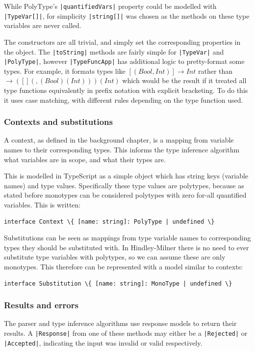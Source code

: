 \documentclass[a4paper,fleqn,oneside,12pt]{report}
\begin{document}
While PolyType’s \texttt{|quantifiedVars|} property could be modelled with \texttt{|TypeVar[]|}, for simplicity \texttt{|string[]|} was chosen as the methods on these type variables are never called.

The constructors are all trivial, and simply set the corresponding properties in the object. The \texttt{|toString|} methods are fairly simple for \texttt{|TypeVar|} and \texttt{|PolyType|}, however \texttt{|TypeFuncApp|} has additional logic to pretty-format some types. For example, it formats types like $[(Bool, Int)] \rightarrow Int$ rather than $\rightarrow ([] (, (Bool) (Int))) (Int)$ which would be the result if it treated all type functions equivalently in prefix notation with explicit bracketing. To do this it uses case matching, with different rules depending on the type function used.
\subsubsection{Contexts and substitutions}\label{id:h.ux3btyb2wvh8}
A context, as defined in the background chapter, is a mapping from variable names to their corresponding types. This informs the type inference algorithm what variables are in scope, and what their types are.

This is modelled in TypeScript as a simple object which has string keys (variable names) and type values. Specifically these type values are polytypes, because as stated before monotypes can be considered polytypes with zero for-all quantified variables. This is written:

\begin{verbatim}
interface Context \{ [name: string]: PolyType | undefined \}
\end{verbatim}

Substitutions can be seen as mappings from type variable names to corresponding types they should be substituted with. In Hindley-Milner there is no need to ever substitute type variables with polytypes, so we can assume these are only monotypes. This therefore can be represented with a model similar to contexts:

\begin{verbatim}
interface Substitution \{ [name: string]: MonoType | undefined \}
\end{verbatim}
\subsubsection{Results and errors}\label{id:h.5yk2zijb0axq}
The parser and type inference algorithms use response models to return their results. A \texttt{|Response|} from one of these methods may either be a \texttt{|Rejected|} or \texttt{|Accepted|}, indicating the input was invalid or valid respectively.
\end{document}
